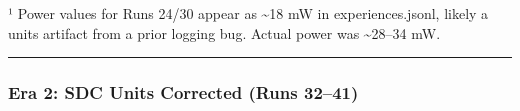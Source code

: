 \begin{record}
\begin{landscape}
\end{landscape}

¹ Power values for Runs 24/30 appear as \textasciitilde18 mW in
experiences.jsonl, likely a units artifact from a prior logging bug.
Actual power was \textasciitilde28--34 mW.

\begin{center}\rule{0.5\linewidth}{0.5pt}\end{center}

\end{record}

\subsubsection{Era 2: SDC Units Corrected (Runs 32--41)}\label{cr:run:asap7:era-2-sdc-units-corrected-runs-3241}

